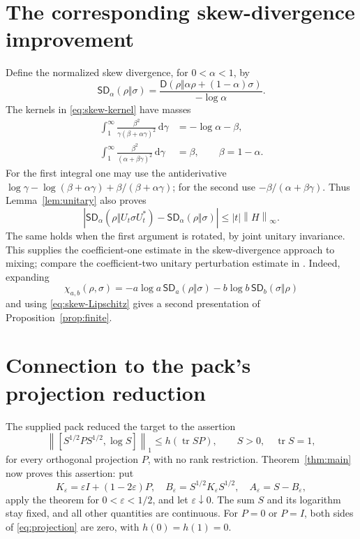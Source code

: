 \documentclass[11pt]{article}
\numberwithin{equation}{section}
\theoremstyle{remark}
\DeclareMathOperator{\tr}{tr}
\newcommand{\Id}{I}
\newcommand{\one}[1]{\left\lVert #1\right\rVert_1}
\newcommand{\op}[1]{\left\lVert #1\right\rVert_\infty}
\newcommand{\rel}{\mathsf D}
\newcommand{\dd}{\,\mathrm d}
\begin{document}
\appendix
\section{The corresponding skew-divergence improvement}

Define the normalized skew divergence, for $0<\alpha<1$, by
\[
 \mathsf{SD}_\alpha(\rho\Vert\sigma)=
 \frac{\rel(\rho\Vert\alpha\rho+(1-\alpha)\sigma)}{-\log\alpha}.
\]
The kernels in \eqref{eq:skew-kernel} have masses
\begin{align*}
 \int_1^\infty\frac{\beta^2}{\gamma(\beta+\alpha\gamma)^2}\dd\gamma
   &=-\log\alpha-\beta,\\
 \int_1^\infty\frac{\beta^2}{(\alpha+\beta\gamma)^2}\dd\gamma
   &=\beta,
 \qquad\beta=1-\alpha.
\end{align*}
For the first integral one may use the antiderivative
$\log\gamma-\log(\beta+\alpha\gamma)+\beta/(\beta+\alpha\gamma)$;
for the second use $-\beta/(\alpha+\beta\gamma)$.
Thus Lemma~\ref{lem:unitary} also proves
\begin{equation}
 |\mathsf{SD}_\alpha(\rho\Vert U_t\sigma U_t^*)
    -\mathsf{SD}_\alpha(\rho\Vert\sigma)|
 \le |t|\op{H}.
 \label{eq:skew-Lipschitz}
\end{equation}
The same holds when the first argument is rotated, by joint unitary
invariance. This supplies the coefficient-one estimate in the
skew-divergence approach to mixing; compare the coefficient-two
unitary perturbation estimate in \cite[Section~8]{Audenaert}.
Indeed, expanding
\[
 \chi_{a,b}(\rho,\sigma)
 =-a\log a\,\mathsf{SD}_a(\rho\Vert\sigma)
  -b\log b\,\mathsf{SD}_b(\sigma\Vert\rho)
\]
and using \eqref{eq:skew-Lipschitz} gives a second presentation of
Proposition~\ref{prop:finite}.

\section{Connection to the pack's projection reduction}

The supplied pack \cite{Pack} reduced the target to the assertion
\begin{equation}
 \one{[S^{1/2}PS^{1/2},\log S]}
 \le h(\tr SP),\qquad S>0,\quad\tr S=1,
 \label{eq:projection}
\end{equation}
for every orthogonal projection $P$, with no rank restriction.
Theorem~\ref{thm:main} now proves this assertion: put
\[
 K_\varepsilon=\varepsilon\Id+(1-2\varepsilon)P,\quad
 B_\varepsilon=S^{1/2}K_\varepsilon S^{1/2},\quad
 A_\varepsilon=S-B_\varepsilon,
\]
apply the theorem for $0<\varepsilon<1/2$, and let $\varepsilon\downarrow0$.
The sum $S$ and its logarithm stay fixed, and all other quantities are
continuous. For $P=0$ or $P=\Id$, both sides of \eqref{eq:projection}
are zero, with $h(0)=h(1)=0$.
\end{document}
